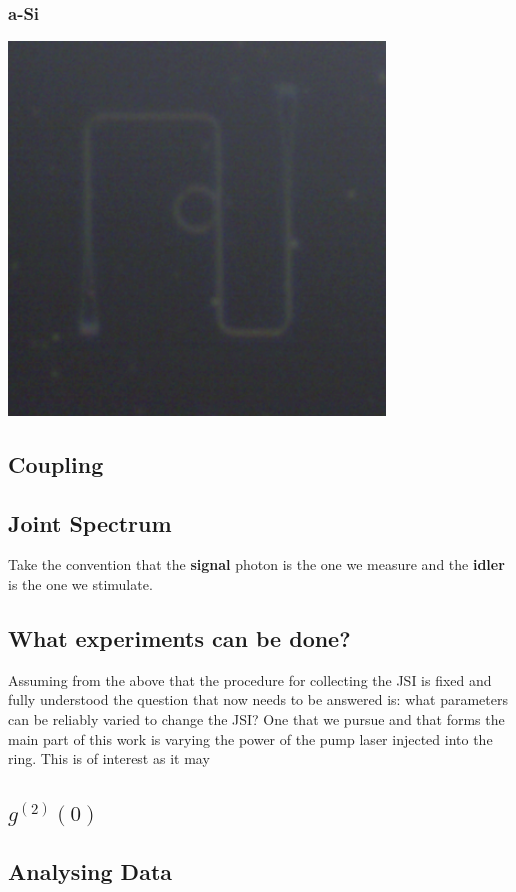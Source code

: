 \subsubsection{a-Si}
\begingroup
    \centering  
    \includegraphics[width=10cm]{img/method/chipPictures/exampleASIRing.png}
     \vspace{3pt} \label{crossCompare}
\endgroup
\subsection{Coupling}
\subsection{Joint Spectrum}
Take the convention that the {\bf signal} photon is the one we measure and the {\bf idler} is the one we stimulate.
\subsection{What experiments can be done?}
Assuming from the above that the procedure for collecting the JSI is fixed and fully understood the question that now needs to be answered is: what parameters can be reliably varied to change the JSI?
One that we pursue and that forms the main part of this work is varying the power of the pump laser injected into the ring. This is of interest as it may 
\subsection{$g^{(2)}(0)$}
\subsection{Analysing Data}

